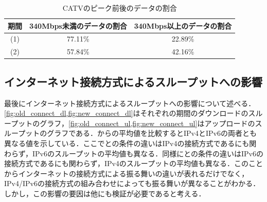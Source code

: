 \begin{table}[htbp]
    \caption{CATVのピーク前後のデータの割合}
    \label{tab:catv}
    \begin{center}
        \begin{tabular}{ccc} \hline
            期間 & 340Mbps未満のデータの割合 & 340Mbps以上のデータの割合 \\ \hline \hline
            (1) & 77.11\% & 22.89\% \\
            (2) & 57.84\% & 42.16\% \\ \hline
        \end{tabular}
    \end{center}
\end{table}
\FloatBarrier

\subsection{インターネット接続方式によるスループットへの影響}
最後にインターネット接続方式によるスループットへの影響について述べる．\cref{fig:old_connect_dl,fig:new_connect_dl}はそれぞれの期間のダウンロードのスループットのグラフ，\cref{fig:old_connect_ul,fig:new_connect_ul}はアップロードのスループットのグラフである．からの平均値を比較するとIPv4とIPv6の両者とも異なる値を示している．ここでとの条件の違いはIPv4の接続方式であるにも関わらず，IPv6のスループットの平均値も異なる．同様にとの条件の違いはIPv6の接続方式であるにも関わらず，IPv4のスループットの平均値も異なる．このことからインターネットの接続方式による振る舞いの違いが表れるだけでなく，IPv4/IPv6の接続方式の組み合わせによっても振る舞いが異なることがわかる．しかし，この影響の要因は他にも検証が必要であると考える．


